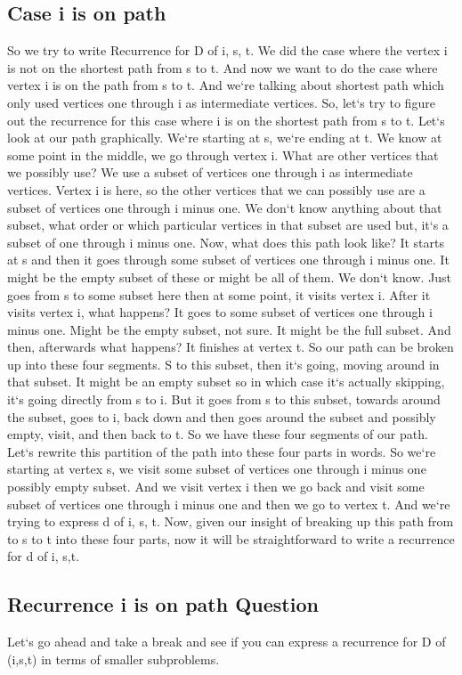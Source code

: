 \subsection{Case  i is on path}
So we try to write Recurrence for D of i, s, t.
We did the case where the vertex i is not on the shortest path from s to t.
And now we want to do the case where vertex i is on the path from s to t.
And we`re talking about shortest path which only used vertices one through i as intermediate vertices.
So, let`s try to figure out the recurrence for this case where i is on the shortest path from s to t.
Let`s look at our path graphically.
We`re starting at s, we`re ending at t.
We know at some point in the middle, we go through vertex i.
What are other vertices that we possibly use? We use a subset of vertices one through i as intermediate vertices.
Vertex i is here, so the other vertices that we can possibly use are a subset of vertices one through i minus one.
We don`t know anything about that subset, what order or which particular vertices in that subset are used but, it`s a subset of one through i minus one.
Now, what does this path look like? It starts at s and then it goes through some subset of vertices one through i minus one.
It might be the empty subset of these or might be all of them.
We don`t know.
Just goes from s to some subset here then at some point, it visits vertex i.
After it visits vertex i, what happens? It goes to some subset of vertices one through i minus one.
Might be the empty subset, not sure.
It might be the full subset.
And then, afterwards what happens? It finishes at vertex t.
So our path can be broken up into these four segments.
S to this subset, then it`s going, moving around in that subset.
It might be an empty subset so in which case it`s actually skipping, it`s going directly from s to i.
But it goes from s to this subset, towards around the subset, goes to i, back down and then goes around the subset and possibly empty, visit, and then back to t.
So we have these four segments of our path.
Let`s rewrite this partition of the path into these four parts in words.
So we`re starting at vertex s, we visit some subset of vertices one through i minus one possibly empty subset.
And we visit vertex i then we go back and visit some subset of vertices one through i minus one and then we go to vertex t.
And we`re trying to express d of i, s, t.
Now, given our insight of breaking up this path from to s to t into these four parts, now it will be straightforward to write a recurrence for d of i, s,t.

\subsection{Recurrence  i is on path Question}
Let`s go ahead and take a break and see if you can express a recurrence for D of (i,s,t) in terms of smaller subproblems.

